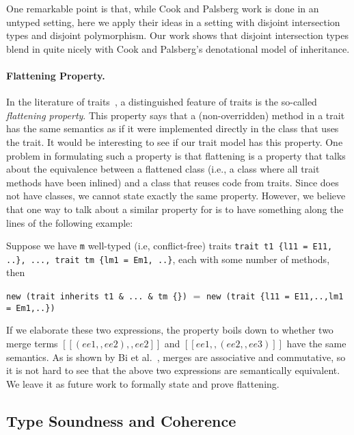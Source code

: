One remarkable point is that, while Cook and Palsberg work is done in
an untyped setting, here we apply their ideas in a setting with
disjoint intersection types and disjoint polymorphism. Our work shows that
disjoint intersection types blend in quite nicely with Cook and
Palsberg's denotational model of inheritance.

\paragraph{Flattening Property.}

In the literature of traits~\cite{Ducasse_2006, scharli2003traits, JOT:issue_2006_05/article4},
a distinguished feature of traits is the
so-called \textit{flattening property}. This property says that a (non-overridden) method in a
trait has the same semantics as if it were implemented directly in the class
that uses the trait. It would be interesting to see if our trait model has this
property. One problem in formulating such a property is that flattening is a
property that talks about the equivalence between a flattened class (i.e., a
class where all trait methods have been inlined) and a class that reuses code
from traits. Since \sedel does not have classes, we cannot state exactly the same
property. However, we believe that one way to talk about a similar property for \sedel is to have something
along the lines of the following example:
\begin{example}[Flattening]
  Suppose we have \lstinline$m$ well-typed (i.e, conflict-free) traits \lstinline$trait t1 {l11 = E11, ..}, ..., trait tm {lm1 = Em1, ..}$,
  each with some number of methods, then
  \begin{center}
   \lstinline|new (trait inherits t1 & ... & tm {})|  $=$  \lstinline|new (trait {l11 = E11,..,lm1 = Em1,..})|
  \end{center}
\end{example}
If we elaborate these two expressions, the property boils down to whether two merge terms
$[[(ee1 ,, ee2) ,, ee2]]$ and $[[ee1 ,, (ee2 ,, ee3)]]$
have the same semantics. As is shown by Bi et al.~\cite{xuan_nested}, merges are
associative and commutative, so it is not hard to see that the above two expressions
are semantically equivalent. We leave it as future work to formally state and prove flattening.


\renewcommand{\rulehl}[1]{#1}

\subsection{Type Soundness and Coherence}

